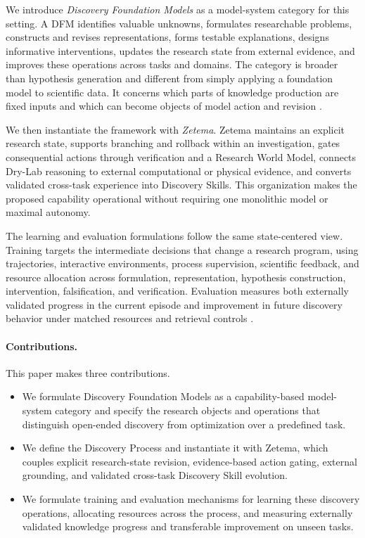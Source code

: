 \documentclass[11pt, a4paper, copyright]{google}
\begin{document}
We introduce \emph{Discovery Foundation Models} as a model-system category for this setting. A DFM identifies valuable unknowns, formulates researchable problems, constructs and revises representations, forms testable explanations, designs informative interventions, updates the research state from external evidence, and improves these operations across tasks and domains. The category is broader than hypothesis generation and different from simply applying a foundation model to scientific data. It concerns which parts of knowledge production are fixed inputs and which can become objects of model action and revision \citep{wang2024scimon,baek2025researchagent,gottweis2026coscientist}.

We then instantiate the framework with \emph{Zetema}. Zetema maintains an explicit research state, supports branching and rollback within an investigation, gates consequential actions through verification and a Research World Model, connects Dry-Lab reasoning to external computational or physical evidence, and converts validated cross-task experience into Discovery Skills. This organization makes the proposed capability operational without requiring one monolithic model or maximal autonomy.

The learning and evaluation formulations follow the same state-centered view. Training targets the intermediate decisions that change a research program, using trajectories, interactive environments, process supervision, scientific feedback, and resource allocation across formulation, representation, hypothesis construction, intervention, falsification, and verification. Evaluation measures both externally validated progress in the current episode and improvement in future discovery behavior under matched resources and retrieval controls \citep{majumder2025discoverybench,chen2025scienceagentbench,huang2024mlagentbench,chan2025mlebench,starace2025paperbench,song2025sde}.

\paragraph{Contributions.}
This paper makes three contributions.
\begin{itemize}[leftmargin=1.4em, itemsep=2pt, topsep=3pt]
    \item We formulate Discovery Foundation Models as a capability-based model-system category and specify the research objects and operations that distinguish open-ended discovery from optimization over a predefined task.
    \item We define the Discovery Process and instantiate it with Zetema, which couples explicit research-state revision, evidence-based action gating, external grounding, and validated cross-task Discovery Skill evolution.
    \item We formulate training and evaluation mechanisms for learning these discovery operations, allocating resources across the process, and measuring externally validated knowledge progress and transferable improvement on unseen tasks.
\end{itemize}
\end{document}
